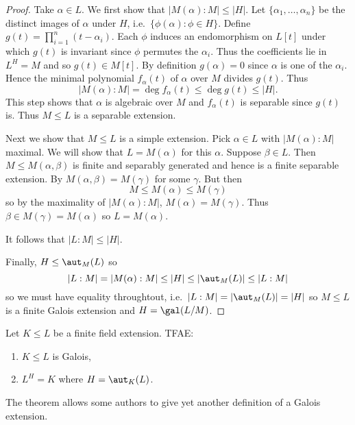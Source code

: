 \documentclass[a4paper]{article}
\begin{document}
\begin{proof}
  Take \(\alpha \in L\). We first show that \(|M(\alpha):M| \leq |H|\). Let \(\{\alpha_1, \dots, \alpha_n\}\) be the distinct images of \(\alpha\) under \(H\), i.e.\ \(\{\phi(\alpha): \phi \in H\}\). Define \(g(t) = \prod_{i = 1}^{n} (t - \alpha_i) \). Each \(\phi\) induces an endomorphism on \(L[t]\) under which \(g(t)\) is invariant since \(\phi\) permutes the \(\alpha_i\). Thus the coefficients lie in \(L^H = M\) and so \(g(t) \in M[t]\). By definition \(g(\alpha) = 0\) since \(\alpha\) is one of the \(\alpha_i\). Hence the minimal polynomial \(f_\alpha(t)\) of \(\alpha\) over \(M\) divides \(g(t)\). Thus
  \[
    |M(\alpha):M| = \deg f_\alpha(t) \leq \deg g(t) \leq |H|.
  \]
  This step shows that \(\alpha\) is algebraic over \(M\) and \(f_\alpha(t)\) is separable since \(g(t)\) is. Thus \(M \leq L\) is a separable extension.

  Next we show that \(M \leq L\) is a simple extension. Pick \(\alpha \in L\) with \(|M(\alpha):M|\) maximal. We will show that \(L = M(\alpha)\) for this \(\alpha\). Suppose \(\beta \in L\). Then \(M \leq M(\alpha, \beta)\) is finite and separably generated and hence is a finite separable extension. By  \(M(\alpha, \beta) = M(\gamma)\) for some \(\gamma\). But then
  \[
    M \leq M(\alpha) \leq M(\gamma)
  \]
  so by the maximality of \(|M(\alpha):M|\), \(M(\alpha) = M(\gamma)\). Thus \(\beta \in M(\gamma) = M(\alpha)\) so \(L = M(\alpha)\).

  It follows that \(|L:M| \leq |H|\).

  Finally, \(H \leq \aut_M(L)\) so
  \[
    |L:M| = |M(\alpha):M| \leq |H| \leq |\aut_M(L)| \leq |L:M|
  \]
  so we must have equality throughtout, i.e.\ \(|L:M| = |\aut_M(L)| = |H|\) so \(M \leq L\) is a finite Galois extension and \(H = \gal(L/M)\).
\end{proof}

\begin{theorem}
  \label{thm:fixed field criterion for galois extension}
  Let \(K \leq L\) be a finite field extension. TFAE:
  \begin{enumerate}
  \item \(K \leq L\) is Galois,
  \item \(L^H = K\) where \(H = \aut_K(L)\).
  \end{enumerate}
\end{theorem}

\begin{remark}
  The theorem allows some authors to give yet another definition of a Galois extension.
\end{remark}
\end{document}
